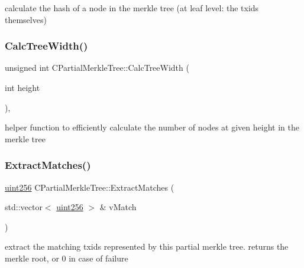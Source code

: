calculate the hash of a node in the merkle tree (at leaf level\+: the txid\textquotesingle{}s themselves) \mbox{\label{class_c_partial_merkle_tree_a7dd0288d62321fb5aa2c27a3372ee8fe}} 
\subsubsection{\texorpdfstring{Calc\+Tree\+Width()}{CalcTreeWidth()}}
{\footnotesize\ttfamily unsigned int C\+Partial\+Merkle\+Tree\+::\+Calc\+Tree\+Width (\begin{DoxyParamCaption}\item[{int}]{height }\end{DoxyParamCaption})\hspace{0.3cm}{\ttfamily [inline]}, {\ttfamily [protected]}}

helper function to efficiently calculate the number of nodes at given height in the merkle tree \mbox{\label{class_c_partial_merkle_tree_a28c3456d1159b33b6c2689ac88eb56ad}} 
\subsubsection{\texorpdfstring{Extract\+Matches()}{ExtractMatches()}}
{\footnotesize\ttfamily \mbox{\hyperlink{classuint256}{uint256}} C\+Partial\+Merkle\+Tree\+::\+Extract\+Matches (\begin{DoxyParamCaption}\item[{std\+::vector$<$ \mbox{\hyperlink{classuint256}{uint256}} $>$ \&}]{v\+Match }\end{DoxyParamCaption})}

extract the matching txid\textquotesingle{}s represented by this partial merkle tree. returns the merkle root, or 0 in case of failure \mbox{\label{class_c_partial_merkle_tree_a44903b156e6c77f3ef977324b24daf1f}} 
